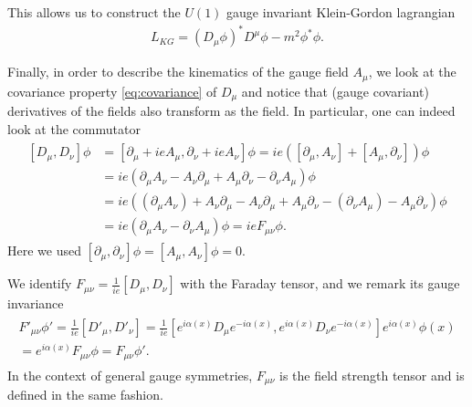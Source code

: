 This allows us to construct the $U(1)$ gauge invariant Klein-Gordon lagrangian 
\begin{align}
    L_{KG} = (D_\mu \phi)^* D^\mu \phi - m^2 \phi^* \phi.
\end{align}

Finally, in order to describe the kinematics of the gauge field $A_\mu$, we look at the covariance property \eqref{eq:covariance} of $D_\mu$ and notice that (gauge covariant) derivatives of the fields also transform as the field. In particular, one can indeed look at the commutator
\begin{align}
\begin{split}
   [D_\mu, D_\nu ] \phi &= [
   \partial_\mu + i e A_\mu, 
   \partial_\nu + i e A_\nu]\phi
   = ie([\partial_\mu , A_\nu] + [A_\mu, \partial_\nu]) \phi \\
   &= ie(
   \partial_\mu A_\nu 
    -  A_\nu \partial_\mu
   +A_\mu \partial_\nu
   -\partial_\nu A_\mu ) \phi \\
   &= ie((\partial_\mu A_\nu) + A_\nu\partial_\mu - A_\nu \partial_\mu + A_\mu\partial_\nu - (\partial_\nu A_\mu) - A_\mu \partial_\nu)\phi \\
   &=  ie(\partial_\mu A_\nu - \partial_\nu A_\mu ) \phi = ie F_{\mu\nu} \phi.
\end{split}\end{align}
Here we used $[\partial_\mu, \partial_\nu]\phi=[A_\mu, A_\nu]\phi=0$.

We identify $F_{\mu\nu} = \frac{1}{ie}[D_\mu, D_\nu]$ with the Faraday tensor, and we remark its gauge invariance
\begin{align}
\begin{split}
   F'_{\mu\nu}\phi' 
   = \frac{1}{ie}[D'_\mu, D'_\nu]  
   = \frac{1}{ie}
    [e^{i\alpha(x)} D_\mu e^{-i\alpha(x)}, 
    e^{i\alpha(x)} D_\nu e^{-i\alpha(x)}] e^{i\alpha(x)}\phi(x) \\
   =e^{i\alpha(x)}F_{\mu\nu}\phi 
   =F_{\mu\nu}\phi'.
\end{split}\end{align}
In the context of general gauge symmetries, $F_{\mu\nu}$ is the field strength tensor and is defined in the same fashion.

